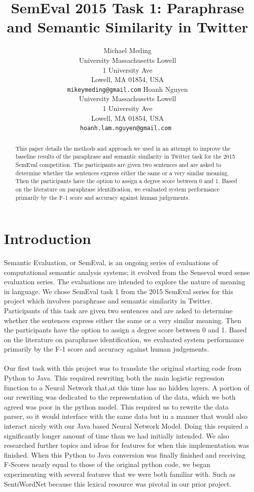 \documentclass[11pt,letterpaper]{article}
\title{SemEval 2015 Task 1: Paraphrase and Semantic Similarity in Twitter}
\author{
	Michael Meding\\
  	University Massachusetts Lowell\\
	1 University Ave\\
	Lowell, MA 01854, USA\\
   {\tt mikeymeding@gmail.com}
	\And  
   Hoanh Nguyen\\
	University Massachusetts Lowell\\
	1 University Ave\\
	Lowell, MA 01854, USA\\
	{\tt hoanh.lam.nguyen@gmail.com }
}
\date{}
\begin{document}
\maketitle

\begin{abstract}
This paper details the methods and approach we used in an attempt to improve the baseline results of the paraphrase and semantic similarity in Twitter task for the 2015 SemEval competition. The participants are given two sentences and are asked to determine whether the sentences express either the same or a very similar meaning. Then the participants have the option to assign a degree score between 0 and 1. Based on the literature on paraphrase identification, we evaluated system performance primarily by the F-1 score and accuracy against human judgements. 
\end{abstract}

\section{Introduction}
\paragraph{} 
Semantic Evaluation, or SemEval, is an ongoing series of evaluations of computational semantic analysis systems; it evolved from the Senseval word sense evaluation series. The evaluations are intended to explore the nature of meaning in language. We chose SemEval task 1 from the 2015 SemEval series for this project which involves paraphrase and semantic similarity in Twitter. Participants of this task are given two sentences and are asked to determine whether the sentences express either the same or a very similar meaning. Then the participants have the option to assign a degree score between 0 and 1. Based on the literature on paraphrase identification, we evaluated system performance primarily by the F-1 score and accuracy against human judgements. 
\paragraph{}
Our first task with this project was to translate the original starting code from Python to Java. This required rewriting both the main logistic regression function to a Neural Network that,at this time has no hidden layers. A portion of our rewriting was dedicated to the representation of the data, which we both agreed was poor in the python model. This required us to rewrite the data parser, so it would interface with the same data but in a manner that would also interact nicely with our Java based Neural Network Model. Doing this required a significantly longer amount of time than we had initially intended. We also researched further topics and ideas for features for when this implementation was finished. When this Python to Java conversion was finally finished and receiving F-Scores nearly equal to those of the original python code, we began experimenting with several features that we were both familiar with. Such as SentiWordNet because this lexical resource was pivotal in our prior project.
\end{document}
